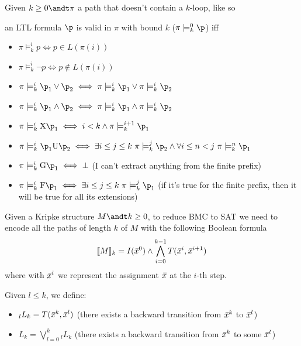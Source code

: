\documentclass[oneside]{academica}
\begin{document}
\begin{definition*}
  Given $k \geq 0 \andt \pi$ a path that doesn't contain a $k$-loop, like so
  \begin{center}
    
  \end{center}
  an LTL formula $\p$ is valid in $\pi$ with bound $k$ ($\pi \models^0_k \p$) iff
  \begin{itemize}
    \item $\pi \models^i_k p \iff p \in L(\pi(i))$
    \item $\pi \models^i_k \neg p \iff p \notin L(\pi(i))$
    \item $\pi \models^i_k \p_1 \lor \p_2 \iff \pi \models^i_k \p_1 \lor \pi \models^i_k \p_2$
    \item $\pi \models^i_k \p_1 \land \p_2 \iff \pi \models^i_k \p_1 \land \pi \models^i_k \p_2$
    \item $\pi \models^i_k \XX\p_1 \iff i < k \land \pi \models^{i+1}_{k} \p_1$
    \item $\pi \models^i_k \p_1 \UU \p_2 \iff \exists i \leq j \leq k \ \pi \models^j_k \p_2 \land \forall i \leq n < j \ \pi \models^n_k \p_1$
    \item $\pi \models^i_k \GG\p_1 \iff \bot$ (I can't extract anything from the finite prefix)
    \item $\pi \models^i_k \FF\p_1 \iff \exists i \leq j \leq k \ \pi \models^j_k \p_1$ (if it's true for the finite prefix, then it will be true for all its extensions)
  \end{itemize}
\end{definition*}

\begin{definition*}
  Given a Kripke structure $M \andt k \geq 0$, to reduce BMC to SAT we need to encode all the paths of length $k$ of $M$ with the following Boolean formula
  \begin{equation*}
    \llbracket {M} \rrbracket_k = I(\,\overline{\!{x}}^0) \land \bigwedge_{i=0}^{k-1} T(\,\overline{\!{x}}^i,\,\overline{\!{x}}^{i+1})
  \end{equation*}
  where with $\,\overline{\!{x}}^i$ we represent the assignment $\,\overline{\!{x}}$ at the $i$-th step.
\end{definition*}

\begin{definition*}
  Given $l \leq k$, we define:
  \begin{itemize}
    \item ${}_l L_k = T(\,\overline{\!{x}}^k, \,\overline{\!{x}}^l)$ (there exists a backward transition from $\,\overline{\!{x}}^k$ to $\,\overline{\!{x}}^l$)
    \item $L_k = \bigvee_{l=0}^{k} {}_l L_k$ (there exists a backward transition from $\,\overline{\!{x}}^k$ to some $\,\overline{\!{x}}^l$)
  \end{itemize}
\end{definition*}
\end{document}

